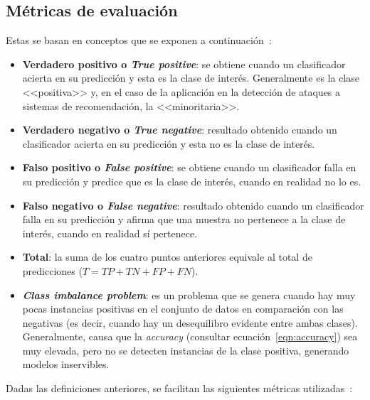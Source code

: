\subsection{Métricas de evaluación}

Estas se basan en conceptos que se exponen a continuación~\cite{apuntesSisint}:

\begin{itemize}
	\item \textbf{Verdadero positivo o \textit{True positive}}: se obtiene cuando un clasificador acierta en su predicción y esta es la clase de interés. Generalmente es la clase <<positiva>> y, en el caso de la aplicación en la detección de ataques a sistemas de recomendación, la <<minoritaria>>.
	\item \textbf{Verdadero negativo o \textit{True negative}}: resultado obtenido cuando un clasificador acierta en su predicción y esta no es la clase de interés.
	\item \textbf{Falso positivo o \textit{False positive}}: se obtiene cuando un clasificador falla en su predicción y predice que es la clase de interés, cuando en realidad no lo es.
	\item \textbf{Falso negativo o \textit{False negative}}: resultado obtenido cuando un clasificador falla en su predicción y afirma que una muestra no pertenece a la clase de interés, cuando en realidad sí pertenece.
	
	\item \textbf{Total}: la suma de los cuatro puntos anteriores equivale al total de predicciones ($T = TP + TN + FP + FN$).
	\item \textbf{\textit{Class imbalance problem}}: es un problema que se genera cuando hay muy pocas instancias positivas en el conjunto de datos en comparación con las negativas (es decir, cuando hay un desequilibro evidente entre ambas clases). Generalmente, causa que la \textit{accuracy} (consultar ecuación~\ref{eqn:accuracy}) sea muy elevada, pero no se detecten instancias de la clase positiva, generando modelos inservibles.
\end{itemize}

Dadas las definiciones anteriores, se facilitan las siguientes métricas utilizadas~\cite{apuntesSisint}:

